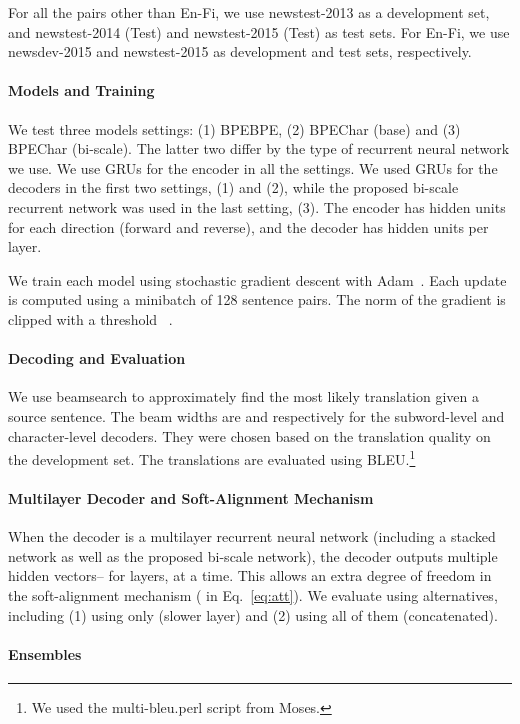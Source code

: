 \documentclass[11pt]{article}
\begin{document}
For all the pairs other than En-Fi, we use newstest-2013 as a development
set, and newstest-2014 (Test) and newstest-2015 (Test) as test sets.
For En-Fi, we use newsdev-2015 and newstest-2015 as development and test sets,
respectively.

\paragraph{Models and Training}
We test three models settings: (1) BPEBPE, (2) BPEChar (base) and (3)
BPEChar (bi-scale). The latter two differ by the type of recurrent neural
network we use. 
We use GRUs for the encoder in all the settings. We used GRUs for the decoders in the
first two settings, (1) and (2), while the proposed bi-scale recurrent network was used in
the last setting, (3). The encoder has  hidden units for each direction (forward
and reverse), and the decoder has  hidden units per layer. 

We train each model using stochastic gradient descent with 
Adam~\cite{kingma2014adam}. Each update is computed using a minibatch of 128
sentence pairs. The norm of the gradient is clipped with a threshold
~\cite{pascanu2013construct}. 

\paragraph{Decoding and Evaluation}
We use beamsearch to approximately find the most likely translation given a
source sentence. The beam widths are  and  respectively for the
subword-level and character-level decoders. They were chosen based on the
translation quality on the development set. The translations are
evaluated using BLEU.\footnote{
    We used the multi-bleu.perl script from Moses.
}

\paragraph{Multilayer Decoder and Soft-Alignment Mechanism}

When the decoder is a multilayer recurrent neural network (including a stacked
network as well as the proposed bi-scale network), the decoder outputs multiple
hidden vectors-- for  layers, at a time.
This allows an extra degree of freedom in the soft-alignment mechanism
( in Eq.~\eqref{eq:att}). We evaluate using alternatives,
including (1) using only  (slower layer) and
(2) using all of them
(concatenated).

\paragraph{Ensembles}
\end{document}
